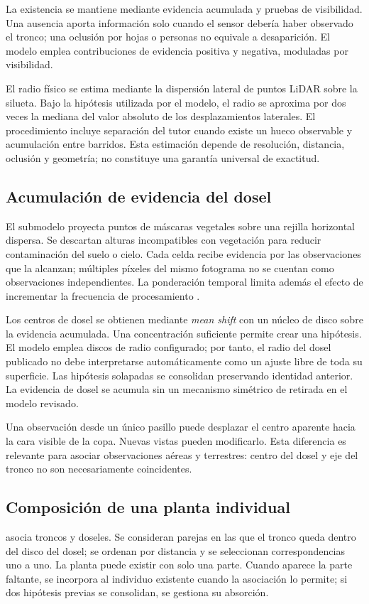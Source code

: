La existencia se mantiene mediante evidencia acumulada y pruebas de visibilidad. Una ausencia aporta información solo cuando el sensor debería haber observado el tronco; una oclusión por hojas o personas no equivale a desaparición. El modelo emplea contribuciones de evidencia positiva y negativa, moduladas por visibilidad.

El radio físico se estima mediante la dispersión lateral de puntos LiDAR sobre la silueta. Bajo la hipótesis utilizada por el modelo, el radio se aproxima por dos veces la mediana del valor absoluto de los desplazamientos laterales. El procedimiento incluye separación del tutor cuando existe un hueco observable y acumulación entre barridos. Esta estimación depende de resolución, distancia, oclusión y geometría; no constituye una garantía universal de exactitud.

\subsection{Acumulación de evidencia del dosel}
El submodelo  proyecta puntos de máscaras vegetales sobre una rejilla horizontal dispersa. Se descartan alturas incompatibles con vegetación para reducir contaminación del suelo o cielo. Cada celda recibe evidencia por las observaciones que la alcanzan; múltiples píxeles del mismo fotograma no se cuentan como observaciones independientes. La ponderación temporal limita además el efecto de incrementar la frecuencia de procesamiento \cite{plants}.

Los centros de dosel se obtienen mediante \emph{mean shift} con un núcleo de disco sobre la evidencia acumulada. Una concentración suficiente permite crear una hipótesis. El modelo emplea discos de radio configurado; por tanto, el radio del dosel publicado no debe interpretarse automáticamente como un ajuste libre de toda su superficie. Las hipótesis solapadas se consolidan preservando identidad anterior. La evidencia de dosel se acumula sin un mecanismo simétrico de retirada en el modelo revisado.

Una observación desde un único pasillo puede desplazar el centro aparente hacia la cara visible de la copa. Nuevas vistas pueden modificarlo. Esta diferencia es relevante para asociar observaciones aéreas y terrestres: centro del dosel y eje del tronco no son necesariamente coincidentes.

\subsection{Composición de una planta individual}
 asocia troncos y doseles. Se consideran parejas en las que el tronco queda dentro del disco del dosel; se ordenan por distancia y se seleccionan correspondencias uno a uno. La planta puede existir con solo una parte. Cuando aparece la parte faltante, se incorpora al individuo existente cuando la asociación lo permite; si dos hipótesis previas se consolidan, se gestiona su absorción.

